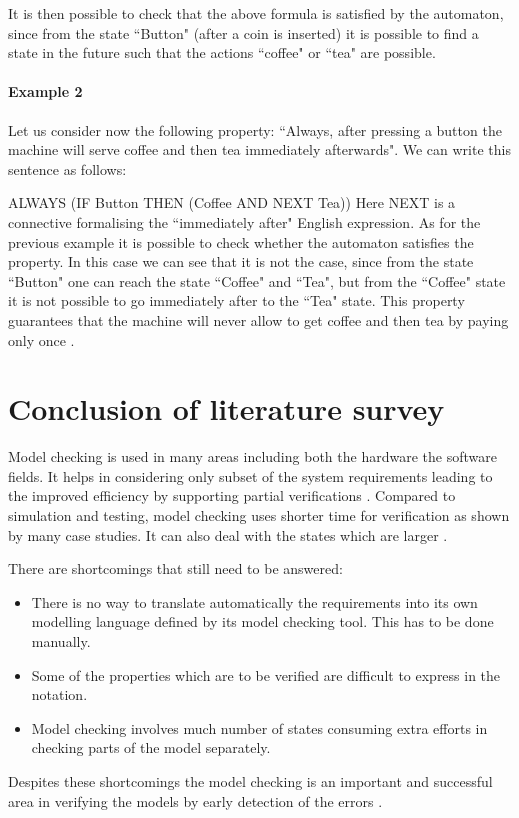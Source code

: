 \documentclass[a4paper,12pt]{report}
\begin{document}
It is then possible to check that the above formula is satisfied by the automaton, since from the state ``Button" (after a coin is inserted) it is possible to find a state in the future such that the actions ``coffee" or ``tea" are possible.
\paragraph{Example 2}
Let us consider now the following property: ``Always, after pressing a button the machine will serve coffee and then tea immediately afterwards". We can write this sentence as follows:

ALWAYS (IF Button THEN (Coffee AND NEXT Tea))
Here NEXT is a connective formalising the ``immediately after" English expression. As for the previous example it is possible to check whether the automaton satisfies the property. In this case we can see that it is not the case, since from the state ``Button" one can reach the state ``Coffee" and ``Tea", but from the ``Coffee" state it is not possible to go immediately after to the ``Tea" state. This property guarantees that the machine will never allow to get coffee and then tea by paying only once \cite{J.M.Wing1996}.

\section{Conclusion of literature survey}
\label{conclude literature survey}

Model checking is used in many areas including both the hardware the software fields. It helps in considering only subset of the system requirements leading to the improved efficiency by supporting partial verifications \cite{Palshikar2004}. Compared to simulation and testing, model checking uses shorter time for verification as shown by many case studies. It can also deal with the states which are larger \cite{Palshikar2004}.

There are shortcomings that still need to be answered:
\begin{itemize}
\item There is no way to translate automatically the requirements into its own modelling language defined by its model checking tool. This has to be done manually.
\item Some of the properties which are to be verified are difficult to express in the notation.
\item Model checking involves much number of states consuming extra efforts in checking parts of the model separately. 
\end{itemize}
Despites these shortcomings the model checking is an important and successful area in verifying the models by early detection of the errors \cite{Havelund2001}.
\end{document}
